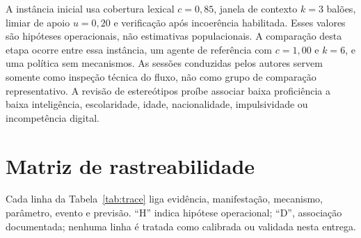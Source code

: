 \documentclass[conference]{IEEEtran}
\begin{document}
A instância inicial usa cobertura lexical $c=0{,}85$, janela de contexto $k=3$ balões, limiar de apoio $u=0{,}20$ e verificação após incoerência habilitada. Esses valores são hipóteses operacionais, não estimativas populacionais. A comparação desta etapa ocorre entre essa instância, um agente de referência com $c=1{,}00$ e $k=6$, e uma política sem mecanismos. As sessões conduzidas pelos autores servem somente como inspeção técnica do fluxo, não como grupo de comparação representativo. A revisão de estereótipos proíbe associar baixa proficiência a baixa inteligência, escolaridade, idade, nacionalidade, impulsividade ou incompetência digital.

\section{Matriz de rastreabilidade}
Cada linha da Tabela~\ref{tab:trace} liga evidência, manifestação, mecanismo, parâmetro, evento e previsão. ``H'' indica hipótese operacional; ``D'', associação documentada; nenhuma linha é tratada como calibrada ou validada nesta entrega.
\end{document}
